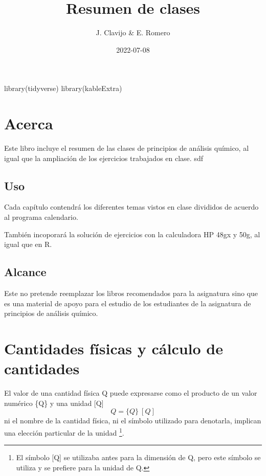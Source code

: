 \documentclass[
]{book}
\title{Resumen de clases}
\author{J. Clavijo \& E. Romero}
\date{2022-07-08}
\newenvironment{Shaded}{\begin{snugshade}}{\end{snugshade}}
\newcommand{\FunctionTok}[1]{\textcolor[rgb]{0.00,0.00,0.00}{#1}}
\newcommand{\NormalTok}[1]{#1}
\theoremstyle{definition}
\theoremstyle{definition}
\theoremstyle{definition}
\theoremstyle{definition}
\theoremstyle{remark}
\begin{document}
\maketitle

{
\setcounter{tocdepth}{1}
\tableofcontents
}
\begin{Shaded}
\begin{Highlighting}[]
\FunctionTok{library}\NormalTok{(tidyverse)}
\FunctionTok{library}\NormalTok{(kableExtra)}
\end{Highlighting}
\end{Shaded}

\hypertarget{acerca}{%
\chapter*{Acerca}\label{acerca}}

Este libro incluye el resumen de las clases de principios de análisis químico, al igual que la ampliación de los ejercicios trabajados en clase. sdf

\hypertarget{uso}{%
\section*{Uso}\label{uso}}

Cada capítulo contendrá los diferentes temas vistos en clase divididos de acuerdo al programa calendario.

También incoporará la solución de ejercicios con la calculadora HP 48gx y 50g, al igual que en R.

\hypertarget{alcance}{%
\section*{Alcance}\label{alcance}}

Este no pretende reemplazar los libros recomendados para la asignatura sino que es una material de apoyo para el estudio de los estudiantes de la asignatura de principios de análisis químico.

\hypertarget{cantidades-fuxedsicas-y-cuxe1lculo-de-cantidades}{%
\chapter{Cantidades físicas y cálculo de cantidades}\label{cantidades-fuxedsicas-y-cuxe1lculo-de-cantidades}}

El valor de una cantidad física Q puede expresarse como el producto de un valor numérico \{Q\} y una unidad {[}Q{]}
\[ Q = \{Q\}\ [Q]\]
ni el nombre de la cantidad física, ni el símbolo utilizado para denotarla, implican una elección particular de la unidad \footnote{El símbolo {[}Q{]} se utilizaba antes para la dimensión de Q, pero este símbolo se utiliza y se prefiere para la unidad de Q.}.
\end{document}

